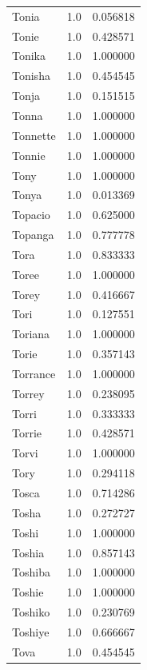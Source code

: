 \documentclass[
  letterpaper,
  DIV=11,
  numbers=noendperiod]{scrreprt}
\begin{document}
\begin{tabular}{lrr}
Tonia           &   1.0 &   0.056818 \\
Tonie           &   1.0 &   0.428571 \\
Tonika          &   1.0 &   1.000000 \\
Tonisha         &   1.0 &   0.454545 \\
Tonja           &   1.0 &   0.151515 \\
Tonna           &   1.0 &   1.000000 \\
Tonnette        &   1.0 &   1.000000 \\
Tonnie          &   1.0 &   1.000000 \\
Tony            &   1.0 &   1.000000 \\
Tonya           &   1.0 &   0.013369 \\
Topacio         &   1.0 &   0.625000 \\
Topanga         &   1.0 &   0.777778 \\
Tora            &   1.0 &   0.833333 \\
Toree           &   1.0 &   1.000000 \\
Torey           &   1.0 &   0.416667 \\
Tori            &   1.0 &   0.127551 \\
Toriana         &   1.0 &   1.000000 \\
Torie           &   1.0 &   0.357143 \\
Torrance        &   1.0 &   1.000000 \\
Torrey          &   1.0 &   0.238095 \\
Torri           &   1.0 &   0.333333 \\
Torrie          &   1.0 &   0.428571 \\
Torvi           &   1.0 &   1.000000 \\
Tory            &   1.0 &   0.294118 \\
Tosca           &   1.0 &   0.714286 \\
Tosha           &   1.0 &   0.272727 \\
Toshi           &   1.0 &   1.000000 \\
Toshia          &   1.0 &   0.857143 \\
Toshiba         &   1.0 &   1.000000 \\
Toshie          &   1.0 &   1.000000 \\
Toshiko         &   1.0 &   0.230769 \\
Toshiye         &   1.0 &   0.666667 \\
Tova            &   1.0 &   0.454545 \\

\end{tabular}
\end{document}
